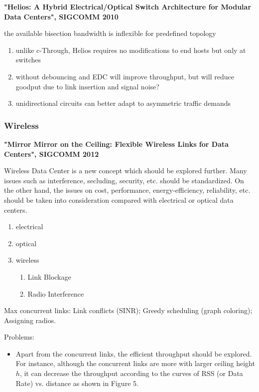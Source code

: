 \documentclass[journal,onecolumn,11pt]{IEEEtran}
\begin{document}
\textbf{"Helios: A Hybrid Electrical/Optical Switch Architecture for Modular Data Centers", SIGCOMM 2010}

the available bisection bandwidth is inflexible for predefined topology

\begin{enumerate}
  \item unlike c-Through, Helios requires no modifications to end hosts but only at switches
  \item without debouncing and EDC will improve throughput, but will reduce goodput due to link insertion and signal noise?
  \item unidirectional circuits can better adapt to asymmetric traffic demands
\end{enumerate}

\subsubsection{Wireless}

\textbf{"Mirror Mirror on the Ceiling: Flexible Wireless Links for Data Centers", SIGCOMM 2012}

Wireless Data Center is a new concept which should be explored further. Many issues such as interference, secluding, security, etc. should be standardized. On the other hand, the issues on cost, performance, energy-efficiency, reliability, etc. should be taken into consideration compared with electrical or optical data centers.


\begin{enumerate}
  \item electrical
  \item optical
  \item wireless
  \begin{enumerate}
    \item Link Blockage
    \item Radio Interference
  \end{enumerate}
\end{enumerate}

Max concurrent links: Link conflicts (SINR); Greedy scheduling (graph coloring); Assigning radios.

Problems:
\begin{itemize}
  \item Apart from the concurrent links, the efficient throughput should be explored. For instance, although the concurrent links are more with larger ceiling height $h$, it can decrease the throughput according to the curves of RSS (or Data Rate) vs. distance as shown in Figure 5.
\end{itemize}
\end{document}
